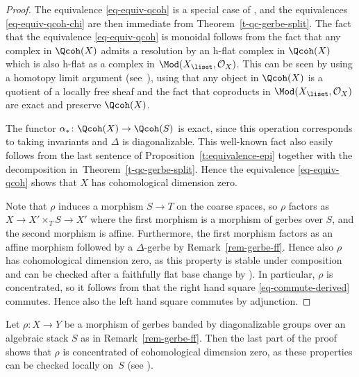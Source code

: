 \begin{proof}
The equivalence \eqref{eq-equiv-qcoh} is a special case of \cite[Proposition~2.2.4.6]{lieblich2004},
and the equivalences \eqref{eq-equiv-qcoh-chi} are then immediate
from Theorem~\ref{t-qc-gerbe-split}.
The fact that the equivalence \eqref{eq-equiv-qcoh} is monoidal follows from the fact that
any complex in $\Qcoh(X)$ admits a resolution 
by an h-flat complex in $\Qcoh(X)$ which is also h-flat as a
complex in $\Mod(X_\liset, \mathcal{O}_X)$.
This can be seen by using a homotopy limit argument (see~\cite[]{stacks-project}),
using that any object in $\Qcoh(X)$ is a quotient of a locally free sheaf and the fact that coproducts in $\Mod(X_\liset, \mathcal{O}_X)$ are exact and preserve $\Qcoh(X)$.

The functor $\alpha_*\colon \Qcoh(X) \to \Qcoh(S)$ is exact,
since this operation corresponds to taking invariants and $\Delta$ is diagonalizable.
This well-known fact also easily follows from the last sentence of Proposition~\ref{t:equivalence-epi}
together with the decomposition in~Theorem~\ref{t-qc-gerbe-split}.
Hence the equivalence \eqref{eq-equiv-qcoh} shows that $X$ has cohomological dimension zero.

Note that $\rho$ induces a morphism $S \to T$ on the coarse spaces,
so $\rho$ factors as $X \to X'\times_T S \to X'$ where the first morphism
is a morphism of gerbes over $S$, and the second morphism is affine.
Furthermore, the first morphism factors as an affine morphism followed by a
$\Delta$-gerbe by Remark~\ref{rem-gerbe-ff}.
Hence also $\rho$ has cohomological dimension zero,
as this property is stable under composition and can be checked after a faithfully flat base change
by \cite[Lemma~2.2]{hr2017}).
In particular, $\rho$ is concentrated, so it follows from \cite[Corollary~2.2]{hnr2018} that the right hand
square \eqref{eq-commute-derived} commutes.
Hence also the left hand square commutes by adjunction.
\end{proof}

\begin{remark}
\label{rem-gerbe-concentrated}
Let $\rho\colon X \to Y$ be a morphism of gerbes banded by diagonalizable groups
over an algebraic stack $S$ as in Remark~\ref{rem-gerbe-ff}.
Then the last part of the proof shows that $\rho$ is concentrated of cohomological dimension zero,
as these properties can be checked locally on~$S$
(see \cite[Lemma~2.2 and Lemma~2.5]{hr2017}).
\end{remark}

